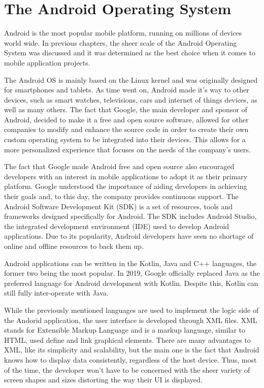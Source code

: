 \documentclass[12pt,a4paper,twoside]{report}
\begin{document}
 \newpage
 \section{The Android Operating System}
 
 Android is the most popular mobile platform, running on millions of devices world wide. In previous chapters, the sheer scale of the Android Operating System was discussed and it was determined as the best choice when it comes to mobile application projects. 
 
 The Android OS is mainly based on the Linux kernel and was originally designed for smartphones and tablets. As time went on, Android made it's way to other devices, such as smart watches, televisions, cars and internet of things devices, as well as many others. The fact that Google, the main developer and sponsor of Android, decided to make it a free and open source software, allowed for other companies to modify and enhance the source code in order to create their own custom operating system to be integrated into their devices. This allows for a more personalized experience that focuses on the needs of the company's users.
 
 The fact that Google made Android free and open source also encouraged developers with an interest in mobile applications to adopt it as their primary platform. Google understood the importance of aiding developers in achieving their goals and, to this day, the company provides continuous support. The Android Software Development Kit (SDK) is a set of resources, tools and frameworks designed specifically for Android. The SDK includes Android Studio, the integrated development environment (IDE) used to develop Android applications. Due to its popularity, Android developers have seen no shortage of online and offline resources to back them up.
 
 Android applications can be written in the Kotlin, Java and C++ languages, the former two being the most popular. In 2019, Google officially replaced Java as the preferred language for Android development with Kotlin. Despite this, Kotlin can still fully inter-operate with Java. 
 
 While the previously mentioned languages are used to implement the logic side of the Andorid application, the user interface is developed through XML files. XML stands for Extensible Markup Language and is a markup language, similar to HTML, used define and link graphical elements. There are many advantages to XML, like its simplicity and scalability, but the main one is the fact that Android knows how to display data consistently, regardless of the host device. Thus, most of the time, the developer won't have to be concerned with the sheer variety of screen shapes and sizes distorting the way their UI is displayed.
 
\end{document}
